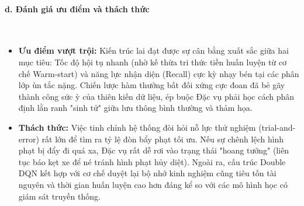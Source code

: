 \paragraph{d. Đánh giá ưu điểm và thách thức} \mbox{} \\
\begin{itemize}
    \item \textbf{Ưu điểm vượt trội:} Kiến trúc lai đạt được sự cân bằng xuất sắc giữa hai mục tiêu: Tốc độ hội tụ nhanh (nhờ kế thừa tri thức tiền huấn luyện từ cơ chế Warm-start) và năng lực nhận diện (Recall) cực kỳ nhạy bén tại các phân lớp ùn tắc nặng. Chiến lược hàm thưởng bất đối xứng cực đoan đã bẻ gãy thành công sức ỳ của thiên kiến dữ liệu, ép buộc Đặc vụ phải học cách phân định lằn ranh "sinh tử" giữa lưu thông bình thường và thảm họa.
    \item \textbf{Thách thức:} Việc tinh chỉnh hệ thống đòi hỏi nỗ lực thử nghiệm (trial-and-error) rất lớn để tìm ra tỷ lệ đòn bẩy phạt tối ưu. Nếu sự chênh lệch hình phạt bị đẩy đi quá xa, Đặc vụ rất dễ rơi vào trạng thái "hoang tưởng" (liên tục báo kẹt xe để né tránh hình phạt hủy diệt). Ngoài ra, cấu trúc Double DQN kết hợp với cơ chế duyệt lại bộ nhớ kinh nghiệm cũng tiêu tốn tài nguyên và thời gian huấn luyện cao hơn đáng kể so với các mô hình học có giám sát truyền thống.
\end{itemize}
